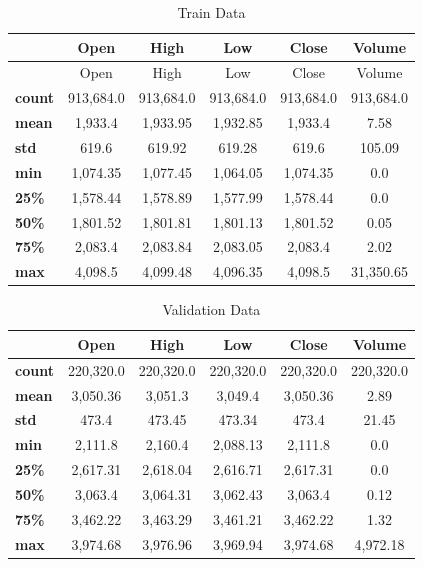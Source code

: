 \begin{table}[H]
    \centering
    \begin{tabular}{L{1.5cm}ccccc}
        \toprule
        & Open & High & Low & Close & Volume
        \\
        \midrule
        & Open & High & Low & Close & Volume
        \\
        \textbf{count} & 913,684.0 & 913,684.0 & 913,684.0 & 913,684.0 & 913,684.0 \\
        \textbf{mean}  & 1,933.4   & 1,933.95  & 1,932.85  & 1,933.4   & 7.58      \\
        \textbf{std}   & 619.6    & 619.92   & 619.28   & 619.6    & 105.09   \\
        \textbf{min}   & 1,074.35  & 1,077.45  & 1,064.05  & 1,074.35  & 0.0       \\
        \textbf{25\%}  & 1,578.44  & 1,578.89  & 1,577.99  & 1,578.44  & 0.0       \\
        \textbf{50\%}  & 1,801.52  & 1,801.81  & 1,801.13  & 1,801.52  & 0.05      \\
        \textbf{75\%}  & 2,083.4   & 2,083.84  & 2,083.05  & 2,083.4   & 2.02      \\
        \textbf{max}   & 4,098.5   & 4,099.48  & 4,096.35  & 4,098.5   & 31,350.65 \\
        \bottomrule
    \end{tabular}
    \caption{Train Data}
    \label{tbl:train-data}
\end{table}

\begin{table}[H]
    \centering
    \begin{tabular}{L{1.5cm}ccccc}
        \toprule
        & Open & High & Low & Close & Volume
        \\
        \midrule
        \textbf{count} & 220,320.0 & 220,320.0 & 220,320.0 & 220,320.0 & 220,320.0 \\
        \textbf{mean}  & 3,050.36  & 3,051.3   & 3,049.4   & 3,050.36  & 2.89      \\
        \textbf{std}   & 473.4    & 473.45   & 473.34   & 473.4    & 21.45    \\
        \textbf{min}   & 2,111.8   & 2,160.4   & 2,088.13  & 2,111.8   & 0.0       \\
        \textbf{25\%}  & 2,617.31  & 2,618.04  & 2,616.71  & 2,617.31  & 0.0       \\
        \textbf{50\%}  & 3,063.4   & 3,064.31  & 3,062.43  & 3,063.4   & 0.12      \\
        \textbf{75\%}  & 3,462.22  & 3,463.29  & 3,461.21  & 3,462.22  & 1.32      \\
        \textbf{max}   & 3,974.68  & 3,976.96  & 3,969.94  & 3,974.68  & 4,972.18  \\
        \bottomrule
    \end{tabular}
    \caption{Validation Data}
    \label{tbl:validation-data}
\end{table}

